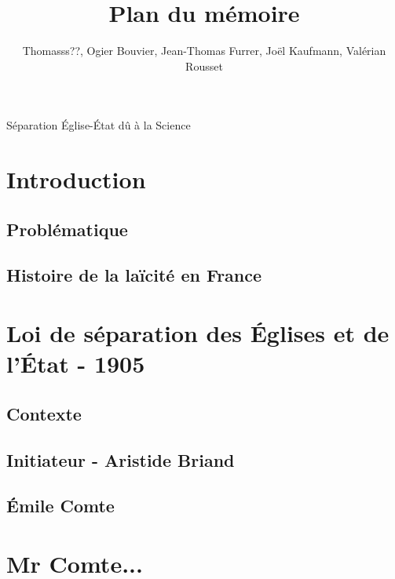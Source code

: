 \documentclass{article}
\title{Plan du m\'emoire}
\author{Thomasss??, Ogier Bouvier, Jean-Thomas Furrer, Jo\"el Kaufmann, Val\'erian Rousset}
\begin{document}
\maketitle

\begin{center}
S\'eparation \'Eglise-\'Etat d\^u à la Science
\end{center}

\section{Introduction}
\subsection{Probl\'ematique}
\subsection{Histoire de la la\"icit\'e en France}

\section{Loi de s\'eparation des \'Eglises et de l'\'Etat - 1905}
\subsection{Contexte}
\subsection{Initiateur - Aristide Briand}
\subsection{\'Emile Comte}

		
\section{Mr Comte...}
\end{document}
